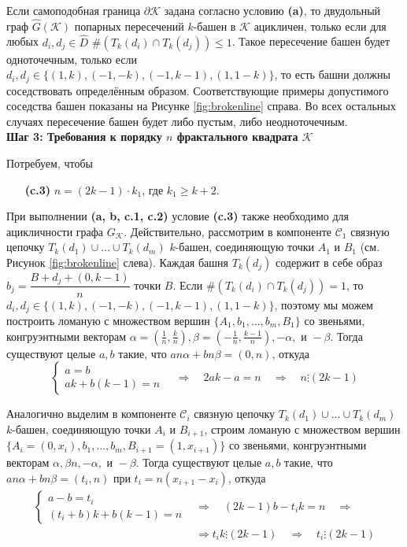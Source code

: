Если самоподобная граница $ \partial{\mathcal{K}}$ задана согласно условию {\bf(a)}, то двудольный граф $\hat G({\mathcal{K}})$ попарных пересечений $k$-башен в ${\mathcal{K}}$ ацикличен, только если для любых $d_i, d_j\in\hat D$ $\#(T_k(d_i)\cap T_k(d_j))\leq1$.
Такое пересечение башен будет одноточечным, только если $d_i, d_j\in\{(1,k), (-1,-k),(-1,k-1),(1,1-k)\}$, то есть башни должны соседствовать определённым образом.
Соответствующие примеры допустимого соседства башен показаны на Рисунке \ref{fig:brokenline} справа.
Во всех остальных случаях пересечение башен будет либо пустым, либо неодноточечным.\\

\textbf{Шаг 3: Требования к порядку $n$ фрактального квадрата ${\mathcal{K}}$}

Потребуем, чтобы
\begin{itemize}
\item[{\bf(c.3)}] $n=(2k-1)\cdot k_1$, где $k_1\geq k+2$.
\end{itemize}
При выполнении {\bf(a, b, c.1, c.2)} условие {\bf(c.3)} также необходимо для ацикличности графа $G_{\mathcal{K}}$.
Действительно, рассмотрим в компоненте ${\mathcal{C}}_1$ связную цепочку $T_k(d_1)\cup\ldots\cup T_k(d_m)$ $k$-башен, соединяющую точки $A_1$ и $B_1$ (см. Рисунок \ref{fig:brokenline} слева).
Каждая башня $T_k(d_j)$ содержит в себе образ $b_j=\dfrac{B+d_j+(0,k-1)}{n}$ точки $B$.
Если $\#(T_k(d_i)\cap T_k(d_j))=1$, то $d_i, d_j\in\{(1,k), (-1,-k), (-1,k-1), (1,1-k)\}$, поэтому мы можем построить ломаную с множеством вершин $\{A_1,b_1,\ldots,b_m,B_1\}$ со звеньями, конгруэнтными векторам $\alpha=(\frac{1}{n},\frac{k}{n}), \beta=(-\frac{1}{n},\frac{k-1}{n}), -\alpha, \text{ и }-\beta.$
Тогда существуют целые $a,b$ такие, что $a n \alpha+b n \beta=(0,n)$, откуда
\begin{equation*}
\begin{cases}
a=b\\
ak+b(k-1)=n
\end{cases}
\quad\Rightarrow\quad
2ak-a=n
\quad\Rightarrow\quad
n\vdots(2k-1)
\end{equation*}

Аналогично выделим в компоненте ${\mathcal{C}}_i$ связную цепочку $T_k(d_1)\cup\ldots\cup T_k(d_m)$ $k$-башен, соединяющую точки $A_i$ и $B_{i+1}$, строим ломаную с множеством вершин $\{A_i=(0, x_i),b_1,\ldots,b_m,B_{i+1}=(1, x_{i+1})\}$ со звеньями, конгруэнтными векторам $\alpha, \beta{n}, -\alpha, \text{ и }-\beta.$
Тогда существуют целые $a, b$ такие, что $a n \alpha+b n \beta=(t_i,n)$ при $t_i=n(x_{i+1}-x_i)$, откуда
\begin{equation*}
\begin{split}
\begin{cases}
a-b=t_i\\
(t_i+b)k+b(k-1)=n
\end{cases}
&\Rightarrow\quad
(2k-1)b-t_ik=n
\quad\Rightarrow\\
&\Rightarrow t_ik\vdots(2k-1)
\quad\Rightarrow\quad
t_i\vdots(2k-1)
\end{split}
\end{equation*}

